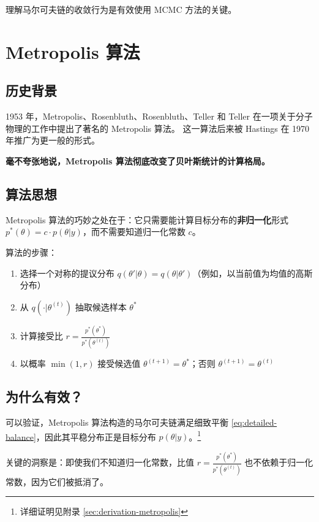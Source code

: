 理解马尔可夫链的收敛行为是有效使用 MCMC 方法的关键。

\section{Metropolis 算法}

\subsection{历史背景}

1953 年，Metropolis、Rosenbluth、Rosenbluth、Teller 和 Teller 在一项关于分子物理的工作中提出了著名的 Metropolis 算法。\cite{metropolis1953equation} 这一算法后来被 Hastings 在 1970 年推广为更一般的形式。\cite{hastings1970monte}

\textbf{毫不夸张地说，Metropolis 算法彻底改变了贝叶斯统计的计算格局。}

\subsection{算法思想}

Metropolis 算法的巧妙之处在于：它只需要能计算目标分布的\textbf{非归一化}形式 $p^*(\theta) = c \cdot p(\theta | y)$，而不需要知道归一化常数 $c$。

算法的步骤：
\begin{enumerate}
  \item 选择一个对称的提议分布 $q(\theta' | \theta) = q(\theta | \theta')$（例如，以当前值为均值的高斯分布）
  \item 从 $q(\cdot | \theta^{(t)})$ 抽取候选样本 $\theta^*$
  \item 计算接受比 $r = \frac{p^*(\theta^*)}{p^*(\theta^{(t)})}$
  \item 以概率 $\min(1, r)$ 接受候选值 $\theta^{(t+1)} = \theta^*$；否则 $\theta^{(t+1)} = \theta^{(t)}$
\end{enumerate}

\subsection{为什么有效？}

可以验证，Metropolis 算法构造的马尔可夫链满足细致平衡 \cref{eq:detailed-balance}，因此其平稳分布正是目标分布 $p(\theta | y)$。\footnote{详细证明见附录 \cref{sec:derivation-metropolis}}

关键的洞察是：即使我们不知道归一化常数，比值 $r = \frac{p^*(\theta^*)}{p^*(\theta^{(t)})}$ 也不依赖于归一化常数，因为它们被抵消了。

